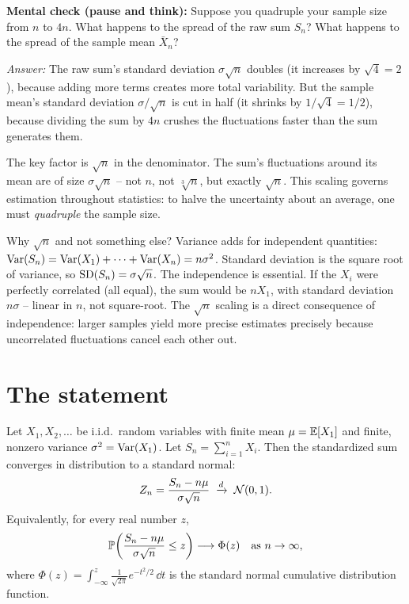 \begin{recoverybox}
\textbf{Mental check (pause and think):} Suppose you quadruple your sample size from $n$ to $4n$.
What happens to the spread of the raw sum $S_n$? What happens to the spread of the sample mean $\bar X_n$?

\emph{Answer:} The raw sum's standard deviation $\sigma\sqrt{n}$ doubles (it increases by $\sqrt{4} = 2$), because adding more terms creates more total variability. But the sample mean's standard deviation $\sigma/\sqrt{n}$ is cut in half (it shrinks by $1/\sqrt{4} = 1/2$), because dividing the sum by $4n$ crushes the fluctuations faster than the sum generates them.
\end{recoverybox}

\begin{focusbox}
The key factor is $\sqrt{n}$ in the denominator. The sum's fluctuations around its
mean are of size $\sigma\sqrt{n}$ -- not $n$, not $\sqrt[3]{n}$, but exactly $\sqrt{n}$.
This scaling governs estimation throughout statistics: to halve the
uncertainty about an average, one must \emph{quadruple} the sample size.
\end{focusbox}

\begin{whybox}
Why $\sqrt{n}$ and not something else? Variance adds for independent quantities:
$\Var(S_n) = \Var(X_1) + \cdots + \Var(X_n) = n\sigma^2$. Standard deviation is the
square root of variance, so $\SD(S_n) = \sigma\sqrt{n}$. The independence is essential.
If the $X_i$ were perfectly correlated (all equal), the sum would be $nX_1$,
with standard deviation $n\sigma$ -- linear in $n$, not square-root. The $\sqrt{n}$ scaling
is a direct consequence of independence: larger samples yield more precise estimates
precisely because uncorrelated fluctuations cancel each other out.
\end{whybox}

\section{The statement}
\label{ch21:statement}

\begin{theorem}
\label{ch21:thm-clt}
Let $X_1, X_2, \dots$ be i.i.d.\ random variables with finite mean $\mu = \E[X_1]$ and
finite, nonzero variance $\sigma^2 = \Var(X_1)$. Let $S_n = \sum_{i=1}^n X_i$. Then the
standardized sum converges in distribution to a standard normal:
\[
  Z_n = \frac{S_n - n\mu}{\sigma\sqrt{n}} \;\dto\; \Normal(0,1).
\]
Equivalently, for every real number $z$,
\[
  \P\!\left( \frac{S_n - n\mu}{\sigma\sqrt{n}} \le z \right) \longrightarrow \Phi(z)
  \quad \text{as } n \to \infty,
\]
where $\Phi(z) = \int_{-\infty}^{z} \frac{1}{\sqrt{2\pi}} e^{-t^2/2}\,\dd t$ is the
standard normal cumulative distribution function.
\end{theorem}

